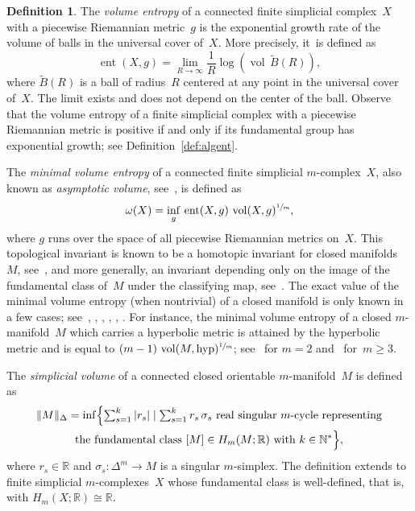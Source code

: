 \documentclass[11pt]{article}
\let\oldsfrac\sfrac
\renewcommand{\sfrac}[2]{{\oldsfrac{#1}{#2}}}
\newcommand{\hyp}{\mathrm{hyp}}
\theoremstyle{definition}
\newtheorem{definition}[theorem]{Definition}
\newcommand\N{{\mathbb N}}
\newcommand\R{{\mathbb R}}
\DeclareMathOperator{\ent}{ent}\let\eent\ent
\DeclareMathOperator{\vol}{vol}
\numberwithin{equation}{section}
\begin{document}
\begin{definition}
The \emph{volume entropy} of a connected finite simplicial complex~$X$ with a piecewise Riemannian metric~$g$ is the exponential growth rate of the volume of balls in the universal cover of~$X$.
More precisely, it~is defined as
\begin{equation}\label{eq:entropy.comp.space}
\ent(X, g) =\lim_{R \to \infty} \frac{1}{R} \log(\vol \, \widetilde{B}(R)),
\end{equation}
where $\widetilde{B}(R)$ is a ball of radius~$R$ centered at any point in the universal cover of~$X$.
The limit exists and does not depend on the center of the ball.
Observe that the volume entropy of a finite simplicial complex with a piecewise Riemannian metric is positive if and only if its fundamental group has exponential growth; see Definition~\ref{def:algent}.

The \emph{minimal volume entropy} of a connected finite simplicial $m$\nobreakdash-complex~$X$, also known as \emph{asymptotic volume}, see~\cite{B93}, is defined as
\[
\omega(X) = \inf_g \, \ent(X,g) \, \vol(X,g)^\sfrac{1}{m},
\]
where $g$ runs over the space of all piecewise Riemannian metrics on~$X$.
This topological invariant is known to be a homotopic invariant for closed manifolds~$M$, see~\cite{B93}, and more generally, an invariant depending only on the image of the fundamental class of~$M$ under the classifying map, see~\cite{Brunnbauer08}.
The exact value of the minimal volume entropy (when nontrivial) of a closed manifold is only known in a few cases; see~\cite{katok}, \cite{BCG91}, \cite{Sambusetti99}, \cite{Sambusetti00}, \cite{CB03}, \cite{merlin}.
For instance, the minimal volume entropy of a closed $m$\nobreakdash-manifold~$M$ which carries a hyperbolic metric is attained by the hyperbolic metric and is equal to $(m-1) \, \vol(M,\hyp)^\sfrac{1}{m}$; see~\cite{katok} for $m=2$ and~\cite{BCG91} for~$m \geq 3$.

The \emph{simplicial volume} of a connected closed orientable $m$\nobreakdash-manifold~$M$ is defined as
\begin{multline*}\textstyle
\Vert M \Vert_\Delta = \inf \Bigl\{\sum_{s=1}^k |r_s| \mid \sum_{s=1}^k r_s \, \sigma_s \text{ real singular } m\text{-cycle representing} \\
\text{the fundamental class } [M] \in H_m(M;\R) \mbox{ with } k \in \N^* \Bigr\},
\end{multline*}
where $r_s \in \R$ and $\sigma_s:\Delta^m \to M$ is a singular $m$\nobreakdash-simplex.
The definition extends to finite simplicial $m$\nobreakdash-complexes~$X$ whose fundamental class is well-defined, that is, with $H_m(X;\R) \cong \R$.
\end{definition}
\end{document}
